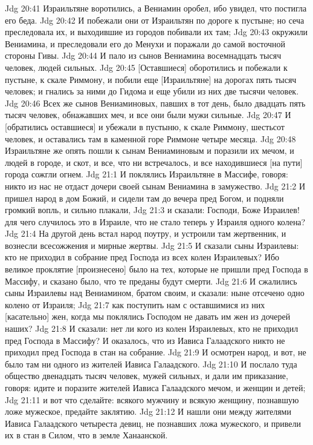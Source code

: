 Jdg 20:41  Израильтяне воротились, а Вениамин оробел, ибо увидел, что постигла его беда.
Jdg 20:42  И побежали они от Израильтян по дороге к пустыне; но сеча преследовала их, и выходившие из городов побивали их там;
Jdg 20:43  окружили Вениамина, и преследовали его до Менухи и поражали до самой восточной стороны Гивы.
Jdg 20:44  И пало из сынов Вениамина восемнадцать тысяч человек, людей сильных.
Jdg 20:45  [Оставшиеся] оборотились и побежали к пустыне, к скале Риммону, и побили еще [Израильтяне] на дорогах пять тысяч человек; и гнались за ними до Гидома и еще убили из них две тысячи человек.
Jdg 20:46  Всех же сынов Вениаминовых, павших в тот день, было двадцать пять тысяч человек, обнажавших меч, и все они были мужи сильные.
Jdg 20:47  И [обратились оставшиеся] и убежали в пустыню, к скале Риммону, шестьсот человек, и оставались там в каменной горе Риммоне четыре месяца.
Jdg 20:48  Израильтяне же опять пошли к сынам Вениаминовым и поразили их мечом, и людей в городе, и скот, и все, что ни встречалось, и все находившиеся [на пути] города сожгли огнем.
Jdg 21:1  И поклялись Израильтяне в Массифе, говоря: никто из нас не отдаст дочери своей сынам Вениамина в замужество.
Jdg 21:2  И пришел народ в дом Божий, и сидели там до вечера пред Богом, и подняли громкий вопль, и сильно плакали,
Jdg 21:3  и сказали: Господи, Боже Израилев! для чего случилось это в Израиле, что не стало теперь у Израиля одного колена?
Jdg 21:4  На другой день встал народ поутру, и устроили там жертвенник, и вознесли всесожжения и мирные жертвы.
Jdg 21:5  И сказали сыны Израилевы: кто не приходил в собрание пред Господа из всех колен Израилевых? Ибо великое проклятие [произнесено] было на тех, которые не пришли пред Господа в Массифу, и сказано было, что те преданы будут смерти.
Jdg 21:6  И сжалились сыны Израилевы над Вениамином, братом своим, и сказали: ныне отсечено одно колено от Израиля;
Jdg 21:7  как поступить нам с оставшимися из них [касательно] жен, когда мы поклялись Господом не давать им жен из дочерей наших?
Jdg 21:8  И сказали: нет ли кого из колен Израилевых, кто не приходил пред Господа в Массифу? И оказалось, что из Иависа Галаадского никто не приходил пред Господа в стан на собрание.
Jdg 21:9  И осмотрен народ, и вот, не было там ни одного из жителей Иависа Галаадского.
Jdg 21:10  И послало туда общество двенадцать тысяч человек, мужей сильных, и дали им приказание, говоря: идите и поразите жителей Иависа Галаадского мечом, и женщин и детей;
Jdg 21:11  и вот что сделайте: всякого мужчину и всякую женщину, познавшую ложе мужеское, предайте заклятию.
Jdg 21:12  И нашли они между жителями Иависа Галаадского четыреста девиц, не познавших ложа мужеского, и привели их в стан в Силом, что в земле Ханаанской.
